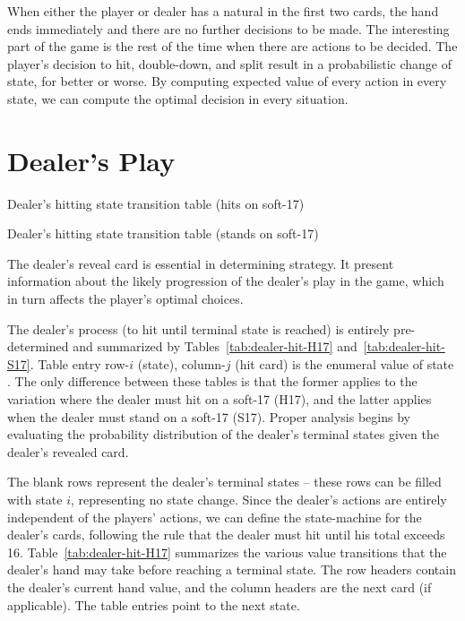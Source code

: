 When either the player or dealer has a natural
in the first two cards, the hand ends immediately
and there are no further decisions to be made.
The interesting part of the game is the rest of the time when
there are actions to be decided.
The player's decision to hit, double-down, and split
result in a probabilistic change of state, for better or worse.
By computing expected value of every action
in every state, we can compute the optimal decision in every situation.  

\section{Dealer's Play}
\label{sec:rules:dealer-play}

\begin{table}[ht!]
\caption{Dealer's hitting state transition table (hits on soft-17)}
\begin{center}

\end{center}
\label{tab:dealer-hit-H17}
\end{table}

\begin{table}[ht!]
\caption{Dealer's hitting state transition table (stands on soft-17)}
\begin{center}

\end{center}
\label{tab:dealer-hit-S17}
\end{table}

The dealer's reveal card is essential in determining strategy.
It present information about the likely progression of the dealer's
play in the game, which in turn affects the player's optimal choices.

The dealer's process (to hit until terminal state is reached)
is entirely pre-determined and summarized by Tables~\ref{tab:dealer-hit-H17}
and~\ref{tab:dealer-hit-S17}.
Table entry row-$i$ (state), column-$j$ (hit card) is the enumeral value
of state .
The only difference between these tables is that the former
applies to the variation where the dealer must hit on a soft-17 (H17),
and the latter applies when the dealer must stand on a soft-17 (S17).
Proper analysis begins by evaluating the probability distribution
of the dealer's terminal states given the dealer's revealed card. 

The blank rows represent the dealer's terminal states --
these rows can be filled with state $i$, representing no state change.
Since the dealer's actions are entirely independent of 
the players' actions, we can define the state-machine
for the dealer's cards, following the rule that the dealer
must hit until his total exceeds 16.
Table~\ref{tab:dealer-hit-H17} summarizes the various
value transitions that the dealer's hand may take
before reaching a terminal state.
The row headers contain the dealer's current hand value, 
and the column headers are the next card (if applicable).
The table entries point to the next state.

